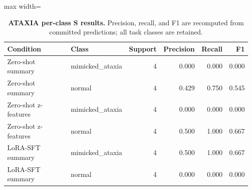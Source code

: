 \begin{table}[H]
\centering
\caption{\textbf{ATAXIA per-class S results.} Precision, recall, and F1 are recomputed from committed predictions; all task classes are retained.}
\label{tab:per_class_ataxia}
\small
\begin{adjustbox}{max width=\textwidth}
\begin{tabular}{llrrrr}
\toprule
Condition & Class & Support & Precision & Recall & F1 \\
\midrule
Zero-shot summary & mimicked\_ataxia & 4 & 0.000 & 0.000 & 0.000 \\
Zero-shot summary & normal & 4 & 0.429 & 0.750 & 0.545 \\
Zero-shot z-features & mimicked\_ataxia & 4 & 0.000 & 0.000 & 0.000 \\
Zero-shot z-features & normal & 4 & 0.500 & 1.000 & 0.667 \\
LoRA-SFT summary & mimicked\_ataxia & 4 & 0.500 & 1.000 & 0.667 \\
LoRA-SFT summary & normal & 4 & 0.000 & 0.000 & 0.000 \\
\bottomrule
\end{tabular}
\end{adjustbox}
\end{table}
